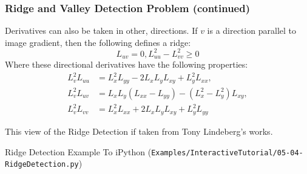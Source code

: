 \begin{frame}[fragile]
\frametitle{Ridge and Valley Detection Problem (continued)}
Derivatives can also be
taken in other, directions. If $v$ is a direction parallel to image
gradient, then the following  defines a ridge:
\begin{equation}
L_{uv} = 0, L_{uu}^2-L^2_{vv} \ge 0
\end{equation}
Where these directional derivatives have the following properties:
\begin{align}
L_v^2L_{uu}&=L_x^2L_{yy}-2L_xL_yL_{xy}+L_y^2L_{xx},\\
L_v^2L_{uv}&=L_xL_y(L_{xx}-L_{yy}) - (L_x^2-L_y^2)L_{xy},\\
L_v^2L_{vv}&=L_x^2L_{xx}+2L_xL_yL_{xy} +L_y^2L_{yy}
\end{align}

This view of the Ridge Detection if taken from Tony Lindeberg's works.

\end{frame}

\begin{frame}{Ridge Detection Example}
To iPython (\texttt{Examples/InteractiveTutorial/05-04-RidgeDetection.py})
\end{frame}




